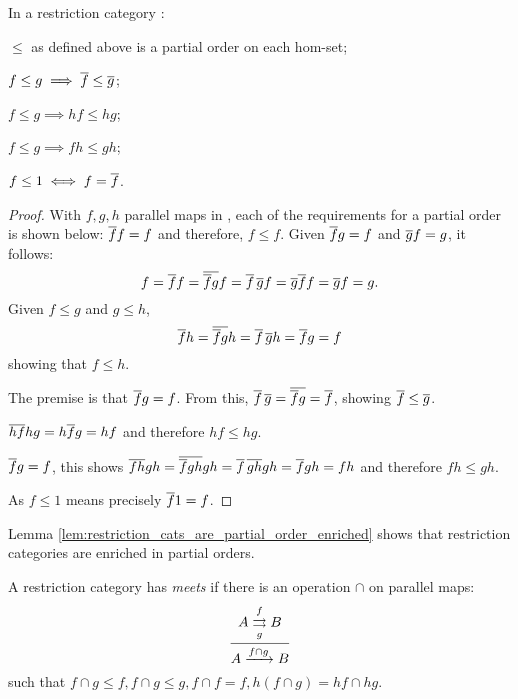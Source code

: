     \begin{lemma}\label{lem:restriction_cats_are_partial_order_enriched}
      In a restriction category \X:
      \bproofenum
        \item  $\le$ as defined  above is a partial order on each hom-set;
        \item $f \le g \implies \overline{f} \le \overline{g}$;
        \item $f \le g \implies h f \le h g$;
        \item $f \le g \implies f h \le g h$;
        \item $f \le 1 \iff f = \overline{f}$.
      \eproofenum
    \end{lemma}
    \begin{proof}
      \bproofenum
        \item With $f,g,h$ parallel maps in \X, each of the requirements for a partial order is 
          shown below:
          \bd
             $\overline{f} f = f$ and therefore, $ f \le f$.
             Given $\overline{f}g = f$ and $\overline{g}f = g$, it follows:
              \[
                f = \overline{f} f = \overline{\overline{f} g} f = \overline{f}\, \overline{g} f
                = \overline{g}\overline{f} f =  \overline{g} f = g.
              \]
             Given $f \le g$ and $g\le h$,
              \[
                \overline{f} h = \overline{\overline{f} g} h = \overline{f}\, \overline{g} h = \overline{f} g = f
              \]
              showing that $f \le h$.
          \ed
        \item The premise is that $\overline{f} g = f$. From this,
          $ \overline{f}\, \overline{g} = \overline{\overline{f} g} = \overline{f}$, showing
          $\overline{f} \le \overline{g}$.
        \item $\overline{h f} hg = h \overline{f} g = h f$ and therefore $h f \le hg$.
        \item $\overline{f} g = f$, this shows  $\overline{f h} g h = \overline{\overline{f} g h} g h
          = \overline{f}\, \overline{g h} g h = \overline{f} g h = f h$ and therefore $f h \le g h$.
        \item As $f \le 1$ means precisely $\overline{f}1 = f$.
      \eproofenum
    \end{proof}

    Lemma \ref{lem:restriction_cats_are_partial_order_enriched} shows that restriction 
    categories are enriched in partial orders.

    \begin{definition}
      A restriction category has \emph{meets} if there is an operation $\cap$ on parallel maps:
      \[
        \infer{A\xrightarrow{f\cap g} B}
          {A\overset{f}{\underset{g}{\rightrightarrows}}B}
      \]
      such that $f\cap g \le f, f\cap g \le g, f\cap f = f, h (f\cap g) = h f \cap hg$.
    \end{definition}

